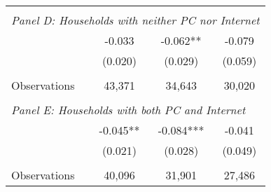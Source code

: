 {\begin{tabular}{lccc}
&  &  &   \\
\multicolumn{4}{l}{\textit{Panel D: Households with neither PC nor Internet}} \\
\hspace{3mm}        &      -0.033   &      -0.062** &      -0.079   \\
                    &     (0.020)   &     (0.029)   &     (0.059)   \\
                    &               &               &               \\
\hspace{3mm}Observations&      43,371   &      34,643   &      30,020   \\
 
&  &  &   \\
\multicolumn{4}{l}{\textit{Panel E: Households with both PC and Internet}} \\
\hspace{3mm}        &      -0.045** &      -0.084***&      -0.041   \\
                    &     (0.021)   &     (0.028)   &     (0.049)   \\
                    &               &               &               \\
\hspace{3mm}Observations&      40,096   &      31,901   &      27,486   \\
 

\bottomrule
\end{tabular}
}
